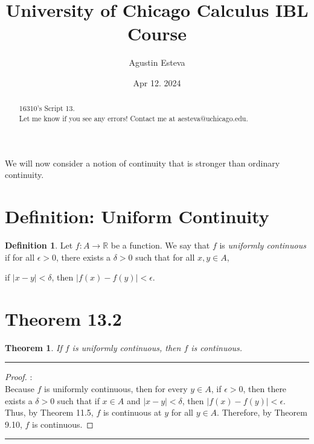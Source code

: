 \documentclass[openany, amssymb, psamsfonts]{amsart}
\title{University of Chicago Calculus IBL Course}
\author{Agustin Esteva}
\date{Apr 12. 2024}
\newcommand{\bbR}{\mathbb{R}}
\newcommand{\abs}[1]{\lvert #1 \rvert}
\newtheorem{thm}{Theorem}[section]
\theoremstyle{definition}
\newtheorem{defn}{Definition}[section]
\numberwithin{equation}{section}
\begin{document}
\begin{abstract}

16310's Script 13.\\ Let me know if you see any errors! Contact me at aesteva@uchicago.edu.


\end{abstract}

\maketitle

\tableofcontents

\setcounter{section}{13}

We will now consider a notion of continuity that is stronger than ordinary continuity. 

\section*{Definition: Uniform Continuity}
\begin{defn}
\label{13.1}
	Let $f\colon A \to \bbR$ be a function. We say that $f$ is \emph{uniformly continuous} if for all $\epsilon > 0$, there exists a $\delta > 0$ such that for all $x, y \in A$,
	\begin{center}
		if $\abs{x - y} < \delta$, \quad then $\abs{f(x) - f(y)} < \epsilon$.
	\end{center}
\end{defn}

\section*{Theorem 13.2}
\begin{thm}
\label{13.2}
	If $f$ is uniformly continuous, then $f$ is continuous.
\end{thm}
 \vspace{4pt}     \hrule   \vspace{4pt} \begin{proof}:\\
Because $f$ is uniformly continuous, then for every $y\in A$, if $\epsilon>0$, then there exists a $\delta>0$ such that if $x \in A$ and $|x-y|<\delta$, then $|f(x) - f(y)|<\epsilon$. Thus, by Theorem 11.5, $f$ is continuous at $y$ for all $y\in A$. Therefore, by Theorem 9.10, $f$ is continuous. 
\end{proof} \vspace{4pt}     \hrule   \vspace{4pt}
\end{document}
